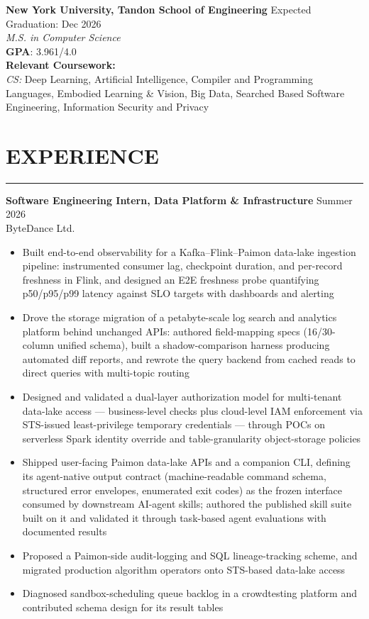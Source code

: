 \documentclass[letterpaper,10pt]{article}
\begin{document}
        \textbf{New York University, Tandon School of Engineering} \hfill Expected Graduation: Dec 2026 \\
        \textit{M.S. in Computer Science} \\
        \textbf{GPA}: 3.961/4.0 \\
        \textbf{Relevant Coursework:} \\
        \textit{CS:} Deep Learning, Artificial Intelligence, Compiler and Programming Languages, Embodied Learning \& Vision, Big Data, Searched Based Software Engineering, Information Security and Privacy \\

	
\section*{EXPERIENCE}
\hrule

\textbf{Software Engineering Intern, Data Platform \& Infrastructure} \hfill Summer 2026\\
ByteDance Ltd.
\begin{itemize}
  \item Built end-to-end observability for a Kafka--Flink--Paimon data-lake ingestion pipeline: instrumented consumer lag, checkpoint duration, and per-record freshness in Flink, and designed an E2E freshness probe quantifying p50/p95/p99 latency against SLO targets with dashboards and alerting
  \item Drove the storage migration of a petabyte-scale log search and analytics platform behind unchanged APIs: authored field-mapping specs (16/30-column unified schema), built a shadow-comparison harness producing automated diff reports, and rewrote the query backend from cached reads to direct queries with multi-topic routing
  \item Designed and validated a dual-layer authorization model for multi-tenant data-lake access --- business-level checks plus cloud-level IAM enforcement via STS-issued least-privilege temporary credentials --- through POCs on serverless Spark identity override and table-granularity object-storage policies
  \item Shipped user-facing Paimon data-lake APIs and a companion CLI, defining its agent-native output contract (machine-readable command schema, structured error envelopes, enumerated exit codes) as the frozen interface consumed by downstream AI-agent skills; authored the published skill suite built on it and validated it through task-based agent evaluations with documented results
  \item Proposed a Paimon-side audit-logging and SQL lineage-tracking scheme, and migrated production algorithm operators onto STS-based data-lake access
  \item Diagnosed sandbox-scheduling queue backlog in a crowdtesting platform and contributed schema design for its result tables
\end{itemize}
\end{document}
